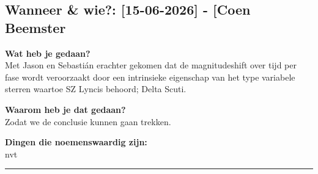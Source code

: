 
\subsection*{Wanneer \& wie?: [15-06-2026] - [Coen Beemster}

\textbf{Wat heb je gedaan?}\\
Met Jason en Sebastián erachter gekomen dat de magnitudeshift over tijd per fase wordt veroorzaakt door een intrinsieke eigenschap van het type variabele sterren waartoe SZ Lyncis behoord; Delta Scuti.
\vspace{0.3cm} 

\noindent \textbf{Waarom heb je dat gedaan?}\\
Zodat we de conclusie kunnen gaan trekken.

\noindent \textbf{Dingen die noemenswaardig zijn:}\\
nvt


\vspace{0.5cm}
\hrule 
\vspace{0.5cm}
